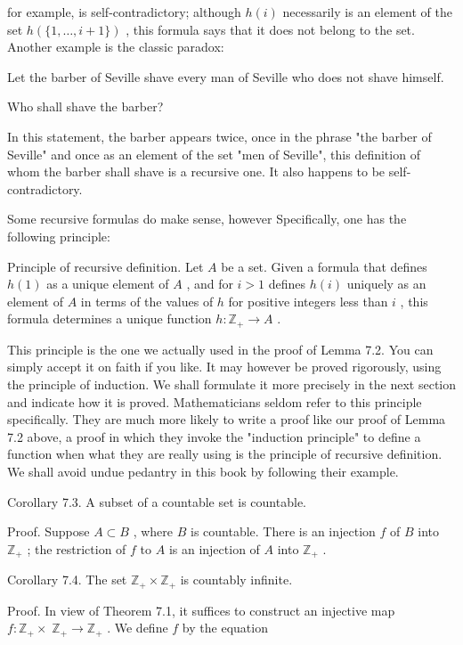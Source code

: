 \documentclass[10pt]{article}
\begin{document}
for example, is self-contradictory; although \(h\left( i\right)\) necessarily is an element of the set \(h\left( {\{ 1,\ldots ,i + 1\} }\right)\) , this formula says that it does not belong to the set. Another example is the classic paradox:

Let the barber of Seville shave every man of Seville who does not shave himself.

Who shall shave the barber?

In this statement, the barber appears twice, once in the phrase "the barber of Seville" and once as an element of the set "men of Seville", this definition of whom the barber shall shave is a recursive one. It also happens to be self-contradictory.

Some recursive formulas do make sense, however Specifically, one has the following principle:

Principle of recursive definition. Let \(A\) be a set. Given a formula that defines \(h\left( 1\right)\) as a unique element of \(A\) , and for \(i > 1\) defines \(h\left( i\right)\) uniquely as an element of \(A\) in terms of the values of \(h\) for positive integers less than \(i\) , this formula determines a unique function \(h : {\mathbb{Z}}_{ + } \rightarrow  A\) .

This principle is the one we actually used in the proof of Lemma 7.2. You can simply accept it on faith if you like. It may however be proved rigorously, using the principle of induction. We shall formulate it more precisely in the next section and indicate how it is proved. Mathematicians seldom refer to this principle specifically. They are much more likely to write a proof like our proof of Lemma 7.2 above, a proof in which they invoke the "induction principle" to define a function when what they are really using is the principle of recursive definition. We shall avoid undue pedantry in this book by following their example.

Corollary 7.3. A subset of a countable set is countable.

Proof. Suppose \(A \subset  B\) , where \(B\) is countable. There is an injection \(f\) of \(B\) into \({\mathbb{Z}}_{ + }\) ; the restriction of \(f\) to \(A\) is an injection of \(A\) into \({\mathbb{Z}}_{ + }\) .

Corollary 7.4. The set \({\mathbb{Z}}_{ + } \times  {\mathbb{Z}}_{ + }\) is countably infinite.

Proof. In view of Theorem 7.1, it suffices to construct an injective map \(f : {\mathbb{Z}}_{ + } \times \; {\mathbb{Z}}_{ + } \rightarrow  {\mathbb{Z}}_{ + }\) . We define \(f\) by the equation
\end{document}
